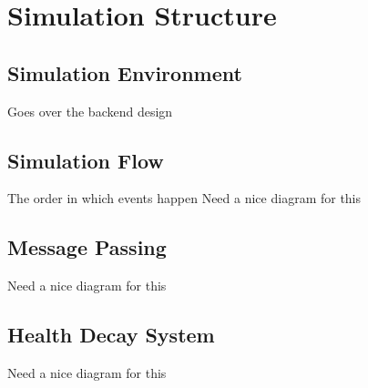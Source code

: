 \chapter{Simulation Structure}\label{simulation_structure}

\section{Simulation Environment}
Goes over the backend design

\section{Simulation Flow}
The order in which events happen
Need a nice diagram for this

\section{Message Passing}
Need a nice diagram for this

\section{Health Decay System}
Need a nice diagram for this
